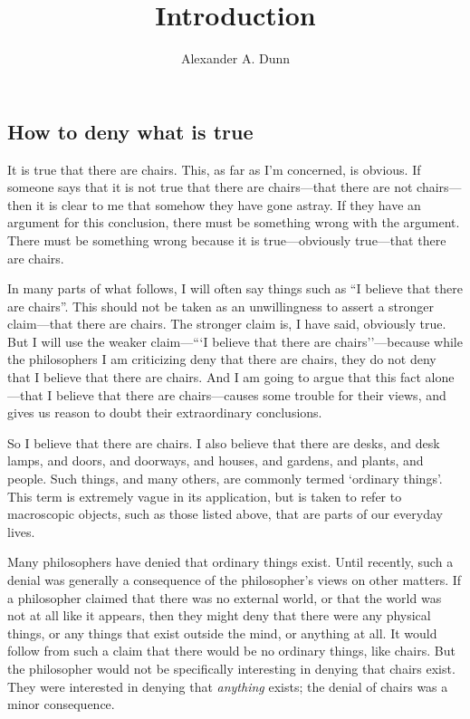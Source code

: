 \documentclass[11pt]{article}
\title{Introduction}
\author{Alexander A. Dunn}
\begin{document}
\ifstandalone
\maketitle
\begin{spacing}{1.25}
\fi

\section{How to deny what is true}
It is true that there are chairs.  This, as far as I'm concerned, is
obvious.  If someone says that it is not true that there are
chairs---that there are not chairs---then it is clear to me that
somehow they have gone astray.  If they have an argument for this
conclusion, there must be something wrong with the argument.  There
must be something wrong because it is true---obviously true---that
there are chairs.

In many parts of what follows, I will often say things such as ``I
believe that there are chairs''.  This should not be taken as an
unwillingness to assert a stronger claim---that there are chairs.  The
stronger claim is, I have said, obviously true.  But I will use the
weaker claim---```I believe that there are chairs''---because while
the philosophers I am criticizing deny that there are chairs, they do
not deny that I believe that there are chairs.  And I am going to
argue that this fact alone---that I believe that there are
chairs---causes some trouble for their views, and gives us reason to
doubt their extraordinary conclusions.

So I believe that there are chairs.  I also believe that there are
desks, and desk lamps, and doors, and doorways, and houses, and
gardens, and plants, and people.  Such things, and many others, are
commonly termed `ordinary things'.  This term is extremely vague in
its application, but is taken to refer to macroscopic objects, such as
those listed above, that are parts of our everyday lives.

Many philosophers have denied that ordinary things exist.  Until
recently, such a denial was generally a consequence of the
philosopher's views on other matters.  If a philosopher claimed that
there was no external world, or that the world was not at all like it
appears, then they might deny that there were any physical things, or
any things that exist outside the mind, or anything at all.  It would
follow from such a claim that there would be no ordinary things, like
chairs.  But the philosopher would not be specifically interesting in
denying that chairs exist.  They were interested in denying that {\em
  anything} exists; the denial of chairs was a minor consequence.


\end{spacing}
\end{document}
